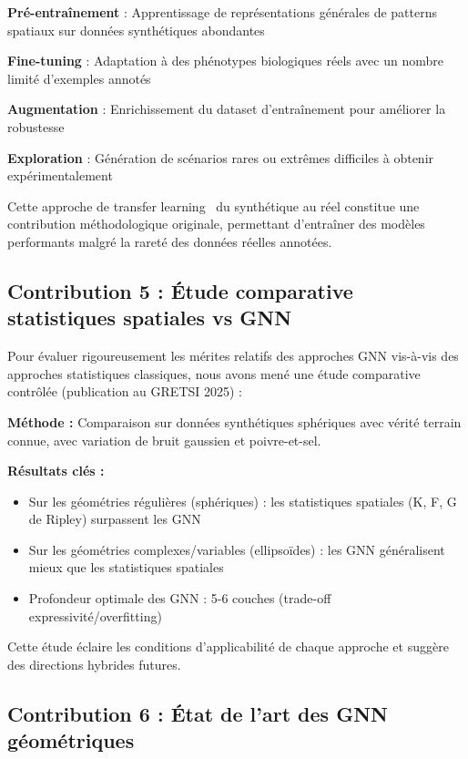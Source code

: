 \textbf{Pré-entraînement} : Apprentissage de représentations générales de patterns spatiaux sur données synthétiques abondantes

\textbf{Fine-tuning} : Adaptation à des phénotypes biologiques réels avec un nombre limité d'exemples annotés

\textbf{Augmentation} : Enrichissement du dataset d'entraînement pour améliorer la robustesse

\textbf{Exploration} : Génération de scénarios rares ou extrêmes difficiles à obtenir expérimentalement

Cette approche de transfer learning~\cite{Pan2010,Weiss2016} du synthétique au réel constitue une contribution méthodologique originale, permettant d'entraîner des modèles performants malgré la rareté des données réelles annotées.

\subsection{Contribution 5 : Étude comparative statistiques spatiales vs GNN}

Pour évaluer rigoureusement les mérites relatifs des approches GNN vis-à-vis des approches statistiques classiques, nous avons mené une étude comparative contrôlée (publication au GRETSI 2025) :

\textbf{Méthode :}
Comparaison sur données synthétiques sphériques avec vérité terrain connue, avec variation de bruit gaussien et poivre-et-sel.

\textbf{Résultats clés :}
\begin{itemize}
    \item Sur les géométries régulières (sphériques) : les statistiques spatiales (K, F, G de Ripley) surpassent les GNN
    \item Sur les géométries complexes/variables (ellipsoïdes) : les GNN généralisent mieux que les statistiques spatiales
    \item Profondeur optimale des GNN : 5-6 couches (trade-off expressivité/overfitting)
\end{itemize}

Cette étude éclaire les conditions d'applicabilité de chaque approche et suggère des directions hybrides futures.

\subsection{Contribution 6 : État de l'art des GNN géométriques}

